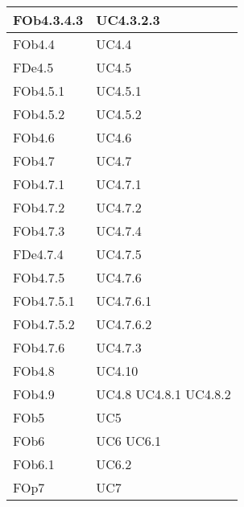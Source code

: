 \begin{longtable}{|l|p{4cm}|}
\hline
FOb4.3.4.3 & UC4.3.2.3 \linebreak  \\ 
\hline
FOb4.4 & UC4.4 \linebreak  \\ 
\hline
FDe4.5 & UC4.5 \linebreak  \\ 
\hline
FOb4.5.1 & UC4.5.1 \linebreak  \\ 
\hline
FOb4.5.2 & UC4.5.2 \linebreak  \\ 
\hline
FOb4.6 & UC4.6 \linebreak  \\ 
\hline
FOb4.7 & UC4.7 \linebreak  \\ 
\hline
FOb4.7.1 & UC4.7.1 \linebreak  \\ 
\hline
FOb4.7.2 & UC4.7.2 \linebreak  \\ 
\hline
FOb4.7.3 & UC4.7.4 \linebreak  \\ 
\hline
FDe4.7.4 & UC4.7.5 \linebreak  \\ 
\hline
FOb4.7.5 & UC4.7.6 \linebreak  \\ 
\hline
FOb4.7.5.1 & UC4.7.6.1 \linebreak  \\ 
\hline
FOb4.7.5.2 & UC4.7.6.2 \linebreak  \\ 
\hline
FOb4.7.6 & UC4.7.3 \linebreak  \\ 
\hline
FOb4.8 & UC4.10 \linebreak  \\ 
\hline
FOb4.9 & UC4.8 \linebreak  UC4.8.1 \linebreak  UC4.8.2 \linebreak  \\ 
\hline
FOb5 & UC5 \linebreak \\ 
\hline
FOb6 & UC6 \linebreak UC6.1 \linebreak \\ 
\hline
FOb6.1 & UC6.2 \linebreak  \\ 
\hline
FOp7 & UC7 \linebreak \\ 

\end{longtable}
